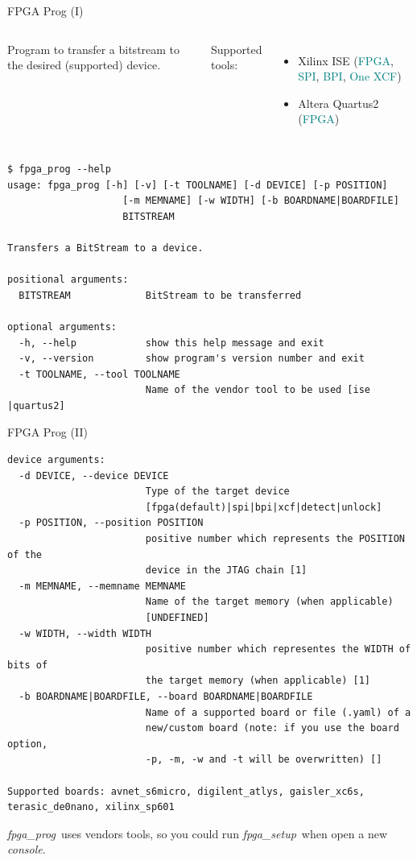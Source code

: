 \documentclass{beamer}
\newcommand{\fpgasetup}      {\textit{fpga\_setup}}
\newcommand{\fpgaprog}       {\textit{fpga\_prog}}
\newcommand{\console}        {\textit{console}}
\begin{document}
\begin{frame}[fragile]{FPGA Prog (I)}
  \begin{columns}
      \begin{block}{}
        \small
        Program to transfer a bitstream to the desired (supported) device.
      \end{block}{}
      \small Supported tools:
      \begin{itemize}
        \tiny
        \item Xilinx ISE (\textcolor{teal}{FPGA}, \textcolor{teal}{SPI}, \textcolor{teal}{BPI}, \textcolor{teal}{One XCF})
        \item Altera Quartus2 (\textcolor{teal}{FPGA})
      \end{itemize}
  \end{columns}
  \tiny
  \begin{verbatim}
$ fpga_prog --help
usage: fpga_prog [-h] [-v] [-t TOOLNAME] [-d DEVICE] [-p POSITION]
                    [-m MEMNAME] [-w WIDTH] [-b BOARDNAME|BOARDFILE]
                    BITSTREAM

Transfers a BitStream to a device.

positional arguments:
  BITSTREAM             BitStream to be transferred

optional arguments:
  -h, --help            show this help message and exit
  -v, --version         show program's version number and exit
  -t TOOLNAME, --tool TOOLNAME
                        Name of the vendor tool to be used [ise |quartus2]
  \end{verbatim}
\end{frame}

\begin{frame}[fragile]{FPGA Prog (II)}
  \tiny
  \begin{verbatim}
device arguments:
  -d DEVICE, --device DEVICE
                        Type of the target device
                        [fpga(default)|spi|bpi|xcf|detect|unlock]
  -p POSITION, --position POSITION
                        positive number which represents the POSITION of the
                        device in the JTAG chain [1]
  -m MEMNAME, --memname MEMNAME
                        Name of the target memory (when applicable)
                        [UNDEFINED]
  -w WIDTH, --width WIDTH
                        positive number which representes the WIDTH of bits of
                        the target memory (when applicable) [1]
  -b BOARDNAME|BOARDFILE, --board BOARDNAME|BOARDFILE
                        Name of a supported board or file (.yaml) of a
                        new/custom board (note: if you use the board option,
                        -p, -m, -w and -t will be overwritten) []

Supported boards: avnet_s6micro, digilent_atlys, gaisler_xc6s,
terasic_de0nano, xilinx_sp601
  \end{verbatim}
  \begin{alertblock}{}
    \small
    \fpgaprog\ uses vendors tools, so you could run \fpgasetup\ when open
    a new \console.
  \end{alertblock}
\end{frame}
\end{document}
